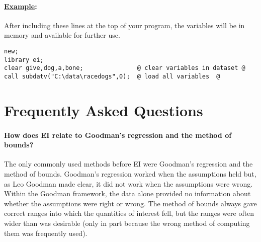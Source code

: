 \documentclass[11pt,titlepage]{article}
\begin{document}
\paragraph{\underline{Example}:}
After including these lines at the top of your program, the variables
will be in memory and available for further use.
\begin{verbatim}
new;
library ei;
clear give,dog,a,bone;               @ clear variables in dataset @
call subdatv("C:\data\racedogs",0);  @ load all variables  @
\end{verbatim}

\section{Frequently Asked Questions}

\paragraph{How does EI relate to Goodman's regression and the method
  of bounds?}
The only commonly used methods before EI were Goodman's regression and
the method of bounds.  Goodman's regression worked when the
assumptions held but, as Leo Goodman made clear, it did not work when
the assumptions were wrong.  Within the Goodman framework, the data
alone provided no information about whether the assumptions were right
or wrong.  The method of bounds always gave correct ranges into which
the quantities of interest fell, but the ranges were often wider than
was desirable (only in part because the wrong method of computing them
was frequently used).
\end{document}
